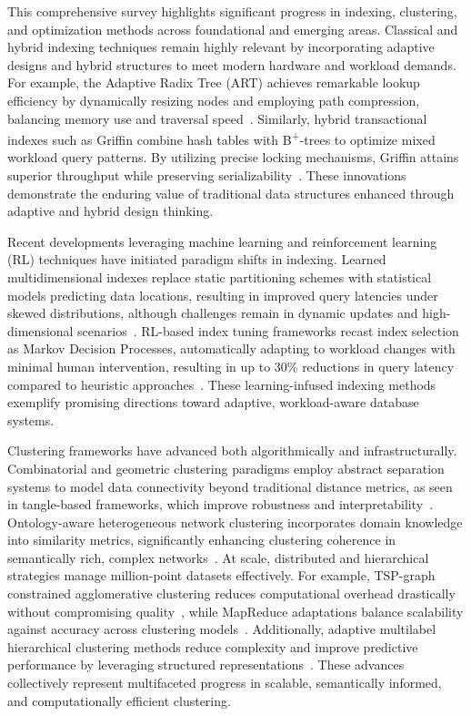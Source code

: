 \documentclass[11pt]{article}
\begin{document}
This comprehensive survey highlights significant progress in indexing, clustering, and optimization methods across foundational and emerging areas. Classical and hybrid indexing techniques remain highly relevant by incorporating adaptive designs and hybrid structures to meet modern hardware and workload demands. For example, the Adaptive Radix Tree (ART) achieves remarkable lookup efficiency by dynamically resizing nodes and employing path compression, balancing memory use and traversal speed~\cite{ref29}. Similarly, hybrid transactional indexes such as Griffin combine hash tables with B\textsuperscript{+}-trees to optimize mixed workload query patterns. By utilizing precise locking mechanisms, Griffin attains superior throughput while preserving serializability~\cite{ref35}. These innovations demonstrate the enduring value of traditional data structures enhanced through adaptive and hybrid design thinking.

Recent developments leveraging machine learning and reinforcement learning (RL) techniques have initiated paradigm shifts in indexing. Learned multidimensional indexes replace static partitioning schemes with statistical models predicting data locations, resulting in improved query latencies under skewed distributions, although challenges remain in dynamic updates and high-dimensional scenarios~\cite{ref30}. RL-based index tuning frameworks recast index selection as Markov Decision Processes, automatically adapting to workload changes with minimal human intervention, resulting in up to 30\% reductions in query latency compared to heuristic approaches~\cite{ref33}. These learning-infused indexing methods exemplify promising directions toward adaptive, workload-aware database systems.

Clustering frameworks have advanced both algorithmically and infrastructurally. Combinatorial and geometric clustering paradigms employ abstract separation systems to model data connectivity beyond traditional distance metrics, as seen in tangle-based frameworks, which improve robustness and interpretability~\cite{ref16}. Ontology-aware heterogeneous network clustering incorporates domain knowledge into similarity metrics, significantly enhancing clustering coherence in semantically rich, complex networks~\cite{ref17}. At scale, distributed and hierarchical strategies manage million-point datasets effectively. For example, TSP-graph constrained agglomerative clustering reduces computational overhead drastically without compromising quality~\cite{ref19}, while MapReduce adaptations balance scalability against accuracy across clustering models~\cite{ref18}. Additionally, adaptive multilabel hierarchical clustering methods reduce complexity and improve predictive performance by leveraging structured representations~\cite{ref20}. These advances collectively represent multifaceted progress in scalable, semantically informed, and computationally efficient clustering.
\end{document}
